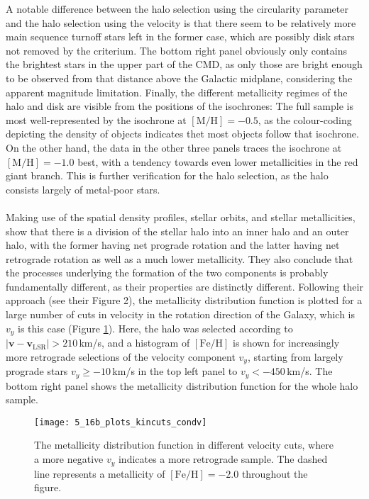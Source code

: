 \documentclass[a4paper,11pt]{article}
\begin{document}
%
A notable difference between the halo selection using the circularity parameter and the halo selection using the velocity is that there seem to be relatively more main sequence turnoff stars left in the former case, which are possibly disk stars not removed by the criterium. The bottom right panel obviously only contains the brightest stars in the upper part of the CMD, as only those are bright enough to be observed from that distance above the Galactic midplane, considering the apparent magnitude limitation. Finally, the different metallicity regimes of the halo and disk are visible from the positions of the isochrones: The full sample is most well-represented by the isochrone at $\mathrm{[M/H]}=-0.5$, as the colour-coding depicting the density of objects indicates thet most objects follow that isochrone. On the other hand, the data in the other three panels traces the isochrone at $\mathrm{[M/H]}=-1.0$ best, with a tendency towards even lower metallicities in the red giant branch. This is further verification for the halo selection, as the halo consists largely of metal-poor stars.\\ \\
%
Making use of the spatial density profiles, stellar orbits, and stellar metallicities, \citet{carollo07} show that there is a division of the stellar halo into an inner halo and an outer halo, with the former having net prograde rotation and the latter having net retrograde rotation as well as a much lower metallicity. They also conclude that the processes underlying the formation of the two components is probably fundamentally different, as their properties are distinctly different. Following their approach (see their Figure 2), the metallicity distribution function is plotted for a large number of cuts in velocity in the rotation direction of the Galaxy, which is $v_y$ is this case (Figure \ref{fig:mdf_kincuts}). Here, the halo was selected according to $|\bm{v}-\bm{v}_\mathrm{LSR}|>210$\,km/s, and a histogram of $\mathrm{[Fe/H]}$ is shown for increasingly more retrograde selections of the velocity component $v_y$, starting from largely prograde stars $v_y\geq-10$\,km/s in the top left panel to $v_y<-450$\,km/s. The bottom right panel shows the metallicity distribution function for the whole halo sample.
%
\begin{figure}[ht]
 \centering
 \texttt{[image: 5\_16b\_plots\_kincuts\_condv]}
 \caption[Metallicity distribution function for different velocity cuts]{The metallicity distribution function in different velocity cuts, where a more negative $v_y$ indicates a more retrograde sample. The dashed line represents a metallicity of $\mathrm{[Fe/H]}=-2.0$ throughout the figure.}
 \label{fig:mdf_kincuts}
\end{figure}\\
\end{document}
